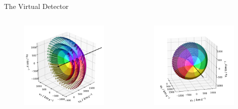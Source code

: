 \documentclass{beamer}
\begin{document}
\begin{frame}{The Virtual Detector}
\begin{columns}
	\column[]{6.5cm}
	\begin{figure}
	\includegraphics[scale=0.35]{Pics/col_shells.pdf}
\end{figure}
	
	
	\column[]{6.5cm}
	\begin{figure}
		\includegraphics[scale=0.38]{Pics/col_vspace_normal.pdf}
	\end{figure}

\end{columns}

\end{frame}
\end{document}
